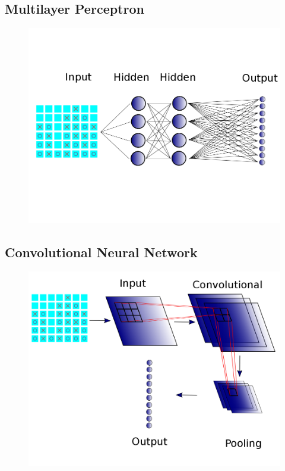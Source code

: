 \subsection{Multilayer Perceptron}

\begin{frame}
\begin{figure}
\includegraphics[width=0.8 \textwidth]{"mlp all lines"}
\end{figure}
\end{frame}

\subsection{Convolutional Neural Network}

\begin{frame}
\begin{figure}
\includegraphics[width=0.8 \textwidth]{"CNN"}
\end{figure}
\end{frame}

